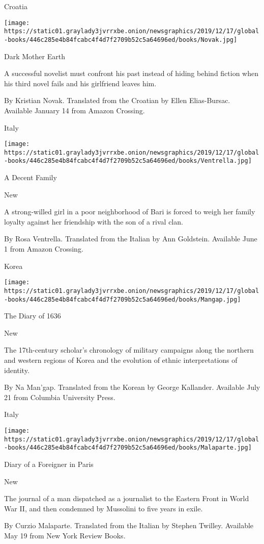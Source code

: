 Croatia

\texttt{[image: https://static01.graylady3jvrrxbe.onion/newsgraphics/2019/12/17/global-books/446c285e4b84fcabc4f4d7f2709b52c5a64696ed/books/Novak.jpg]}

Dark Mother Earth

A successful novelist must confront his past instead of hiding behind
fiction when his third novel fails and his girlfriend leaves him.

 By Kristian Novak. Translated from the Croatian by Ellen Elias-Bursac.
Available January 14 from Amazon Crossing.

Italy

\texttt{[image: https://static01.graylady3jvrrxbe.onion/newsgraphics/2019/12/17/global-books/446c285e4b84fcabc4f4d7f2709b52c5a64696ed/books/Ventrella.jpg]}

A Decent Family

New

A strong-willed girl in a poor neighborhood of Bari is forced to weigh
her family loyalty against her friendship with the son of a rival clan.

 By Rosa Ventrella. Translated from the Italian by Ann Goldstein.
Available June 1 from Amazon Crossing.

Korea

\texttt{[image: https://static01.graylady3jvrrxbe.onion/newsgraphics/2019/12/17/global-books/446c285e4b84fcabc4f4d7f2709b52c5a64696ed/books/Mangap.jpg]}

The Diary of 1636

New

The 17th-century scholar's chronology of military campaigns along the
northern and western regions of Korea and the evolution of ethnic
interpretations of identity.

 By Na Man'gap. Translated from the Korean by George Kallander.
Available July 21 from Columbia University Press.

Italy

\texttt{[image: https://static01.graylady3jvrrxbe.onion/newsgraphics/2019/12/17/global-books/446c285e4b84fcabc4f4d7f2709b52c5a64696ed/books/Malaparte.jpg]}

Diary of a Foreigner in Paris

New

The journal of a man dispatched as a journalist to the Eastern Front in
World War II, and then condemned by Mussolini to five years in exile.

 By Curzio Malaparte. Translated from the Italian by Stephen Twilley.
Available May 19 from New York Review Books.

